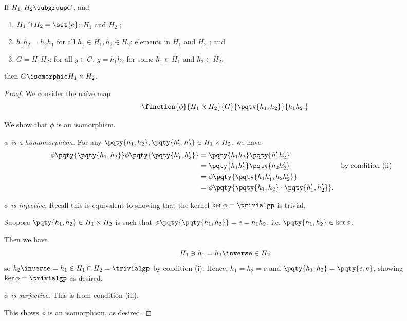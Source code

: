 \begin{theorem}
    \label{thm:dpt-direct-product-theorem}%
    If \(H_1, H_2 \subgroup G\), and
    \begin{enumerate}
        \item \(H_1 \cap H_2 = \set{e}\): \(H_1\) and \(H_2\) ;
        \item \(h_1 h_2 = h_2 h_1\) for all \(h_1 \in H_1, h_2 \in H_2\): elements in \(H_1\) and \(H_2\) ; and
        \item \(G = H_1 H_2\): for all \(g \in G\), \(g = h_1 h_2\) for some \(h_1 \in H_1\) and \(h_2 \in H_2\);
    \end{enumerate}
    then \(G \isomorphic H_1 \times H_2\).
\end{theorem}

\begin{proof}
    We consider the na\"{i}ve map
    \[
        \function{\phi}{H_1 \times H_2}{G}{\pqty{h_1, h_2}}{h_1 h_2.}
    \]

    We show that \(\phi\) is an isomorphism.

    \emph{\(\phi\) is a homomorphism.} For any \(\pqty{h_1, h_2}, \pqty{h_1', h_2'} \in H_1 \times H_2\), we have
    \begin{align*}
        \phi\pqty{\pqty{h_1, h_2}} \phi\pqty{\pqty{h_1', h_2'}} &= \pqty{h_1 h_2} \pqty{h_1' h_2'} \\
        &= \pqty{h_1 h_1'} \pqty{h_2 h_2'} && \text{by condition (ii)} \\
        &= \phi\pqty{\pqty{h_1 h_1', h_2 h_2'}} \\
        &= \phi\pqty{\pqty{h_1, h_2} \cdot \pqty{h_1', h_2'}}.
    \end{align*}

    \emph{\(\phi\) is injective.} Recall this is equivalent to showing that the kernel \(\ker \phi = \trivialgp\) is trivial.

    Suppose \(\pqty{h_1, h_2} \in H_1 \times H_2\) is such that \(\phi\pqty{\pqty{h_1, h_2}} = e = h_1 h_2\), i.e. \(\pqty{h_1, h_2} \in \ker\phi\).

    Then we have
    \[
        H_1 \ni h_1 = h_2\inverse \in H_2
    \]
    so \(h_2\inverse = h_1 \in H_1 \cap H_2 = \trivialgp\) by condition (i). Hence, \(h_1 = h_2 = e\) and \(\pqty{h_1, h_2} = \pqty{e, e}\), showing \(\ker \phi = \trivialgp\) as desired.

    \emph{\(\phi\) is surjective.} This is from condition (iii).

    This shows \(\phi\) is an isomorphism, as desired.
\end{proof}


